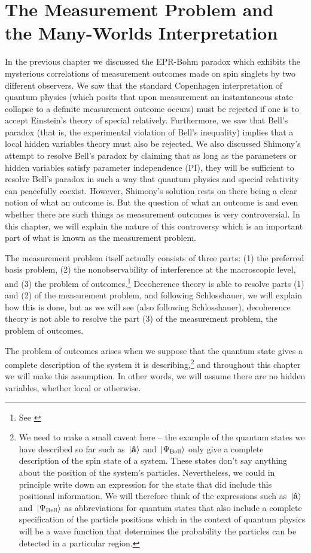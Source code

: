 \chapter{The Measurement Problem and the Many-Worlds Interpretation\label{measprobchap}}
In the previous chapter we discussed the EPR-Bohm paradox which exhibits the mysterious correlations of measurement outcomes made on spin singlets by two different observers. We saw that the standard Copenhagen interpretation of quantum physics (which posits that upon measurement  an instantaneous state collapse to a definite measurement outcome occurs) must be rejected if one is to accept Einstein's theory of special relatively. Furthermore, we saw that Bell's paradox (that is, the experimental violation of Bell's inequality) implies that a local hidden variables theory must also be rejected. We also discussed Shimony's attempt to resolve Bell's paradox by claiming that as long as the parameters or hidden variables satisfy parameter independence (PI), they will be sufficient to resolve Bell's paradox in such a way that quantum physics and special relativity can peacefully coexist. However, Shimony's solution rests on there being a clear notion of what an outcome is. But the question of what an outcome is and even whether there are such things as measurement outcomes is very controversial. In this chapter, we will explain the nature of this controversy which is an important part of what is known as the measurement problem. 

The measurement problem itself actually consists of three parts: (1) the preferred basis problem, (2) the nonobservability of interference at the macroscopic level, and (3) the problem of outcomes.\footnote{See \cite[50]{Schlosshauer}} 
Decoherence theory is able to resolve parts (1) and (2) of the measurement problem, and following Schlosshauer, we will explain how this is done, but as we will see (also following Schlosshauer), decoherence theory is not able to resolve the part (3) of the measurement problem, the problem of outcomes.

The problem of outcomes arises when we suppose that the quantum state gives a complete description of the system it is describing,\footnote{We need to make a small caveat here -- the example of the quantum states we have described so far such as $\ket*{\vb{\hat{{a}}}}$ and $\ket*{\Psi_{\text{Bell}}}$ only give a complete description of the spin state of a system. These states don't say anything about the position of the system's particles. Nevertheless, we could in principle write down an expression for the state that did include this positional information. We will therefore think of the expressions such as $\ket*{\vb{\hat{{a}}}}$ and $\ket*{\Psi_{\text{Bell}}}$ as abbreviations for quantum states that also include a complete specification of the particle positions which in the context of quantum physics will be a wave function that determines the probability the particles can be detected in a particular region.} and throughout this chapter we will make this assumption. In other words, we will assume there are no hidden variables, whether local or otherwise. 

